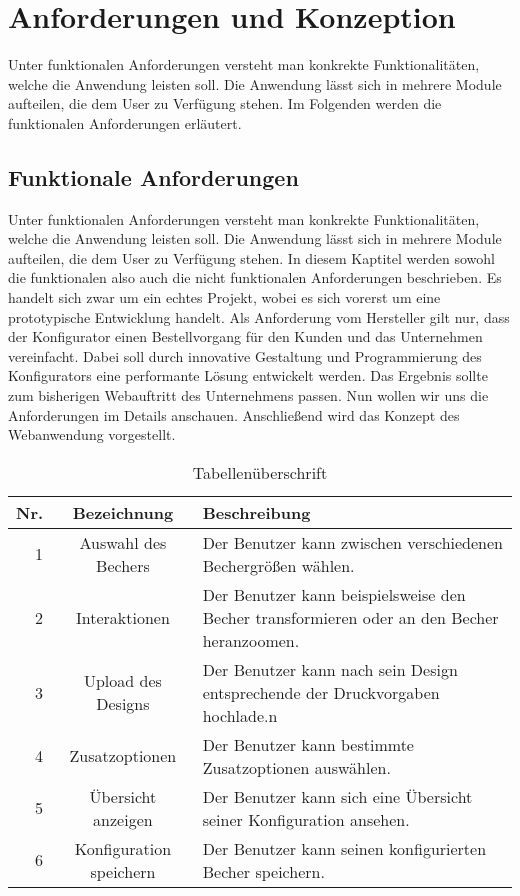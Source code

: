 %
%
%
\chapter{Anforderungen und Konzeption}
\label{cha:methodik}
%
Unter funktionalen Anforderungen versteht man konkrekte Funktionalitäten, welche die Anwendung leisten soll. Die Anwendung lässt sich in mehrere Module aufteilen, die dem User zu Verfügung stehen. Im Folgenden werden die funktionalen Anforderungen erläutert.
%
%
%
%
\section{Funktionale Anforderungen}
\label{sec:problemanalyse}
%
Unter funktionalen Anforderungen versteht man konkrekte Funktionalitäten, welche die Anwendung leisten soll. Die Anwendung lässt sich in mehrere Module aufteilen, die dem User zu Verfügung stehen. In diesem Kaptitel werden sowohl die funktionalen also auch die nicht funktionalen Anforderungen beschrieben. Es handelt sich zwar um ein echtes Projekt, wobei es sich vorerst um eine prototypische Entwicklung handelt. Als Anforderung vom Hersteller gilt nur, dass der Konfigurator einen Bestellvorgang für den Kunden und das Unternehmen vereinfacht. Dabei soll durch innovative Gestaltung und Programmierung des Konfigurators eine performante Lösung entwickelt werden. Das Ergebnis sollte zum bisherigen Webauftritt des Unternehmens passen. Nun wollen wir uns die Anforderungen im Details anschauen. Anschließend wird das Konzept des Webanwendung vorgestellt.

\renewcommand{\arraystretch}{1.8}
\begin{table}[h]
	\begin{tabular}{|r|c|p{8.5cm}|}
		\hline
		\textbf{Nr.} & \textbf{Bezeichnung} & \textbf{Beschreibung} \\
		\hline
		1 & Auswahl des Bechers & Der Benutzer kann zwischen verschiedenen Bechergrößen wählen. \\
		\hline
		2 & Interaktionen & Der Benutzer kann beispielsweise den Becher transformieren oder an den Becher heranzoomen. \\
		\hline
		3 & Upload des Designs & Der Benutzer kann nach sein Design entsprechende der Druckvorgaben hochlade.n \\
		\hline
		4 & Zusatzoptionen & Der Benutzer kann bestimmte Zusatzoptionen auswählen. \\
		\hline
		5 & Übersicht anzeigen & Der Benutzer kann sich eine Übersicht seiner Konfiguration ansehen. \\
		\hline
		6 & Konfiguration speichern & Der Benutzer kann seinen konfigurierten Becher speichern. \\
		\hline
	\end{tabular}
\caption{Tabellenüberschrift}
\end{table}
%
